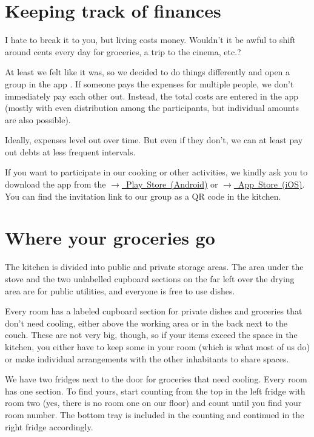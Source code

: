 \section{Keeping track of finances}
I hate to break it to you, but living costs money. Wouldn't it be awful to shift around cents every day for groceries, a trip to the cinema, etc.?

At least we felt like it was, so we decided to do things differently and open a group in the app . If someone pays the expenses for multiple people, we don't immediately pay each other out. Instead, the total costs are entered in the app (mostly with even distribution among the participants, but individual amounts are also possible).

Ideally, expenses level out over time. But even if they don't, we can at least pay out debts at less frequent intervals.

If you want to participate in our cooking or other activities, we kindly ask you to download the app from the \mbox{\href{https://play.google.com/store/apps/details?id=com.Splitwise.SplitwiseMobile&hl=de&pli=1}{$\xrightarrow{}$ Play Store (Android)}} or \mbox{\href{https://apps.apple.com/de/app/splitwise/id458023433}{$\xrightarrow{}$ App Store (iOS)}}. You can find the invitation link to our group as a QR code in the kitchen.

\section{Where your groceries go}
The kitchen is divided into public and private storage areas. The area under the stove and the two unlabelled cupboard sections on the far left over the drying area are for public utilities, and everyone is free to use dishes.

Every room has a labeled cupboard section for private dishes and groceries that don't need cooling, either above the working area or in the back next to the couch. These are not very big, though, so if your items exceed the space in the kitchen, you either have to keep some in your room (which is what most of us do) or make individual arrangements with the other inhabitants to share spaces. 

We have two fridges next to the door for groceries that need cooling. Every room has one section. To find yours, start counting from the top in the left fridge with room two (yes, there is no room one on our floor) and count until you find your room number. The bottom tray is included in the counting and continued in the right fridge accordingly.

